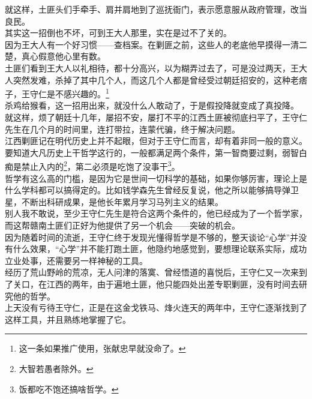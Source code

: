 \begin{multicols}{\theparacolNo}
就这样，土匪头们手牵手、肩并肩地到了巡抚衙门，表示愿意服从政府管理，改当良民。\\

其实这一招倒也不坏，可到王大人那里，实在是过不了关的。\\

因为王大人有一个好习惯——查档案。在剿匪之前，这些人的老底他早摸得一清二楚，真心假意他心里有数。\\

土匪们看到王大人以礼相待，都十分高兴，以为糊弄过去了，可是没过两天，王大人突然发难，杀掉了其中几个人，而这几个人都是曾经受过朝廷招安的，这种老痞子，王守仁是不感兴趣的。\footnote{这一条如果推广使用，张献忠早就没命了。}\\

杀鸡给猴看，这一招用出来，就没什么人敢动了，于是假投降就变成了真投降。\\

就这样，烦了朝廷十几年，屡招不安，屡打不平的江西土匪被彻底扫平了，王守仁先生在几个月的时间里，连打带拉，连蒙代骗，终于解决问题。\\

江西剿匪记在明代历史上并不起眼，但对于王守仁而言，却有着非同一般的意义。\\

要知道大凡历史上干哲学这行的，一般都满足两个条件，第一智商要过剩，弱智白痴是禁止入内的\footnote{大智若愚者除外。}，第二必须是吃饱了没事干\footnote{饭都吃不饱还搞啥哲学。}。\\

哲学有这么高的门槛，是因为它是世间一切科学的基础，如果你够厉害，理论上是什么学科都可以搞得定的。比如钱学森先生曾经反复说，他之所以能够搞导弹卫星，不断出科研成果，是他长年累月学习马列主义的结果。\\

别人我不敢说，至少王守仁先生是符合这两个条件的，他已经成为了一个哲学家，而这帮赣南土匪们正好为他提供了另一个机会——突破的机会。\\

因为随着时间的流逝，王守仁终于发现光懂得哲学是不够的，整天谈论“心学”并没有什么效果，“心学”并不能打跑土匪，他隐约地感觉到，要想理论联系实际，成功立业处事，还需要另一样神秘的工具。\\

经历了荒山野岭的荒凉，无人问津的落寞、曾经悟道的喜悦后，王守仁又一次来到了关口，在江西的两年，由于遍地土匪，他只能四处出差专职剿匪，没有时间去研究他的哲学。\\

上天没有亏待王守仁，正是在这金戈铁马、烽火连天的两年中，王守仁逐渐找到了这样工具，并且熟练地掌握了它。\\


\end{multicols}
